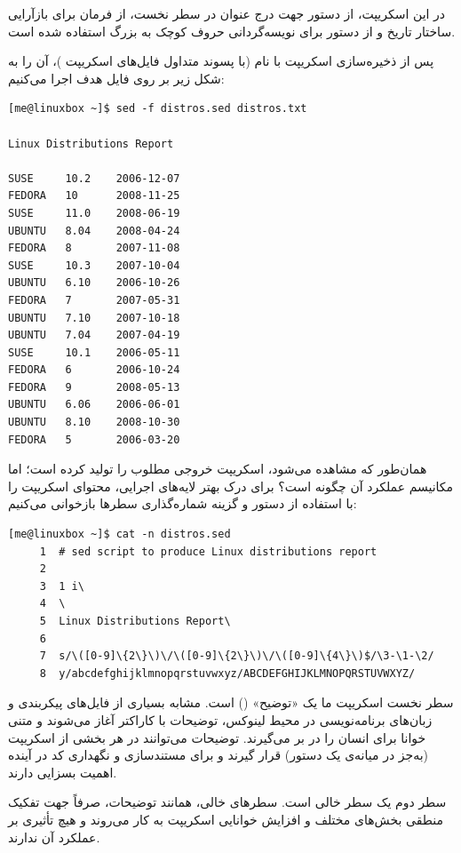در این اسکریپت، از دستور  جهت درج عنوان در سطر نخست، از فرمان  برای بازآرایی ساختار تاریخ و از دستور  برای نویسه‌گردانی حروف کوچک به بزرگ استفاده شده است.

پس از ذخیره‌سازی اسکریپت با نام  (با پسوند متداول فایل‌های اسکریپت )، آن را به شکل زیر بر روی فایل هدف اجرا می‌کنیم:

\begin{latin}
\begin{lstlisting}
[me@linuxbox ~]$ sed -f distros.sed distros.txt

Linux Distributions Report

SUSE     10.2    2006-12-07
FEDORA   10      2008-11-25
SUSE     11.0    2008-06-19
UBUNTU   8.04    2008-04-24
FEDORA   8       2007-11-08
SUSE     10.3    2007-10-04
UBUNTU   6.10    2006-10-26
FEDORA   7       2007-05-31
UBUNTU   7.10    2007-10-18
UBUNTU   7.04    2007-04-19
SUSE     10.1    2006-05-11
FEDORA   6       2006-10-24
FEDORA   9       2008-05-13
UBUNTU   6.06    2006-06-01
UBUNTU   8.10    2008-10-30
FEDORA   5       2006-03-20
\end{lstlisting}
\end{latin}

همان‌طور که مشاهده می‌شود، اسکریپت خروجی مطلوب را تولید کرده است؛ اما مکانیسم عملکرد آن چگونه است؟ برای درک بهتر لایه‌های اجرایی، محتوای اسکریپت را با استفاده از دستور  و گزینه شماره‌گذاری سطرها بازخوانی می‌کنیم:

\begin{latin}
\begin{lstlisting}
[me@linuxbox ~]$ cat -n distros.sed
     1  # sed script to produce Linux distributions report
     2
     3  1 i\
     4  \
     5  Linux Distributions Report\
     6
     7  s/\([0-9]\{2\}\)\/\([0-9]\{2\}\)\/\([0-9]\{4\}\)$/\3-\1-\2/
     8  y/abcdefghijklmnopqrstuvwxyz/ABCDEFGHIJKLMNOPQRSTUVWXYZ/
\end{lstlisting}
\end{latin}

سطر نخست اسکریپت ما یک «توضیح» () است. مشابه بسیاری از فایل‌های پیکربندی و زبان‌های برنامه‌نویسی در محیط لینوکس، توضیحات با کاراکتر \cmd{\#} آغاز می‌شوند و متنی خوانا برای انسان را در بر می‌گیرند. توضیحات می‌توانند در هر بخشی از اسکریپت (به‌جز در میانه‌ی یک دستور) قرار گیرند و برای مستندسازی و نگهداری کد در آینده اهمیت بسزایی دارند.

سطر دوم یک سطر خالی است. سطرهای خالی، همانند توضیحات، صرفاً جهت تفکیک منطقی بخش‌های مختلف و افزایش خوانایی اسکریپت به کار می‌روند و هیچ تأثیری بر عملکرد آن ندارند.

